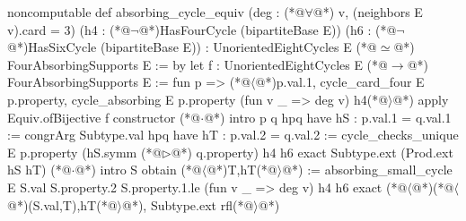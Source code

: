 noncomputable def absorbing_cycle_equiv
    (deg : (*@$\forall$@*) v, (neighbors E v).card = 3)
    (h4 : (*@$\neg$@*)HasFourCycle (bipartiteBase E))
    (h6 : (*@$\neg$@*)HasSixCycle (bipartiteBase E)) :
    UnorientedEightCycles E (*@$\simeq$@*) FourAbsorbingSupports E := by
  let f : UnorientedEightCycles E (*@$\to$@*) FourAbsorbingSupports E := fun p =>
    (*@$\langle$@*)p.val.1, cycle_card_four E p.property,
      cycle_absorbing E p.property (fun v _ => deg v) h4(*@$\rangle$@*)
  apply Equiv.ofBijective f
  constructor
  (*@$\cdot$@*) intro p q hpq
    have hS : p.val.1 = q.val.1 := congrArg Subtype.val hpq
    have hT : p.val.2 = q.val.2 := cycle_checks_unique E p.property
      (hS.symm (*@$\triangleright$@*) q.property) h4 h6
    exact Subtype.ext (Prod.ext hS hT)
  (*@$\cdot$@*) intro S
    obtain (*@$\langle$@*)T,hT(*@$\rangle$@*) := absorbing_small_cycle E S.val S.property.2
      S.property.1.le (fun v _ => deg v) h4 h6
    exact (*@$\langle$@*)(*@$\langle$@*)(S.val,T),hT(*@$\rangle$@*), Subtype.ext rfl(*@$\rangle$@*)
